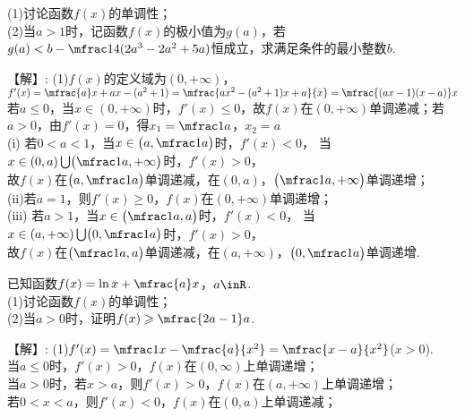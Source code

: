 \begin{exercise}
    (1)讨论函数$f(x)$的单调性；\\
    (2)当$a>1$时，记函数$f(x)$的极小值为$g(a)$，若$g(a)<b-\mfrac14(2a^3-2a^2+5a)$恒成立，求满足条件的最小整数$b$.
    \begin{answer}
      【解】:
      (1)$f(x)$的定义域为$(0,+\infty)$，\\
         $f'(x)=\mfrac{a}x+ax-(a^2+1)=\mfrac{ax^2-(a^2+1)x+a}{x}=\mfrac{(ax-1)(x-a)}x$\fz[2]
         若$a\leqslant0$，当$x\in(0,+\infty)$时，$f'(x)\leqslant0$，故$f(x)$在$(0,+\infty)$单调递减；\fz[3]
         若$a>0$，由$f'(x)=0$，得$x_1=\mfrac1a$，$x_2=a$\\
         (i) 若$0<a<1$，当$x\in\bigl(a,\mfrac1a\bigr)$时，$f'(x)<0$，
             当$x\in(0,a)\bigcup\bigl(\mfrac1a,+\infty\bigr)$时，$f'(x)>0$，\\
             故$f(x)$在$\bigl(a,\mfrac1a\bigr)$单调递减，在$(0,a)$，$\bigl(\mfrac1a,+\infty\bigr)$单调递增；\\
         (ii)若$a=1$，则$f'(x)\geqslant0$，$f(x)$在$(0,+\infty)$单调递增；\\
         (iii) 若$a>1$，当$x\in\bigl(\mfrac1a,a\bigr)$时，$f'(x)<0$，
             当$x\in(a,+\infty)\bigcup\bigl(0,\mfrac1a\bigr)$时，$f'(x)>0$，\\
             故$f(x)$在$\bigl(\mfrac1a,a\bigr)$单调递减，在$(a,+\infty)$，$\bigl(0,\mfrac1a\bigr)$单调递增.\fz[5]
    \end{answer}
  \vspace{15em}
  \item %
    已知函数$f(x)=\ln x+\mfrac{a}x$，$a\inR$.\\
    (1)讨论函数$f(x)$的单调性；\\
    (2)当$a>0$时，证明$f(x)\geqslant\mfrac{2a-1}a$.
    \begin{answer}
      【解】:
      (1)$f'(x)=\mfrac1x-\mfrac{a}{x^2}=\mfrac{x-a}{x^2}$($x>0$).\\
         当$a\leqslant0$时，$f'(x)>0$，$f(x)$在$(0,\infty)$上单调递增；\\
         当$a>0$时，若$x>a$，则$f'(x)>0$，$f(x)$在$(a,+\infty)$上单调递增；\\
         若$0<x<a$，则$f'(x)<0$，$f(x)$在$(0,a)$上单调递减；\fz[4]
    \end{answer}
   \vspace{8em}

\end{exercise}


